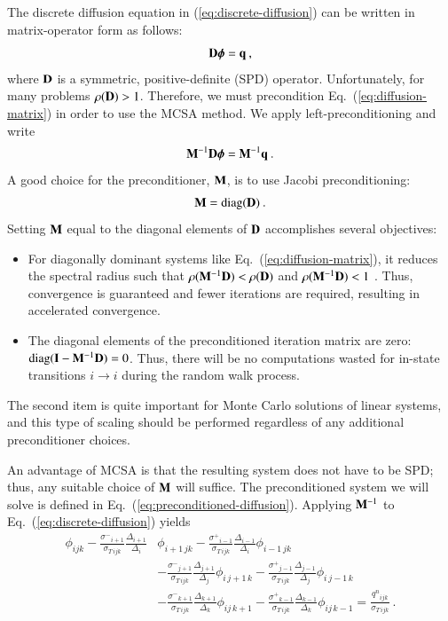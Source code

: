 \documentclass[preprint,12pt]{elsarticle}
\newcommand{\vI}{\ensuremath{\ve{I}}}
\newcommand{\qn}{\ensuremath{q^n}} \newcommand{\Tn}{\ensuremath{T^n}}
\newcommand{\Di}{\ensuremath{\Delta_i}}
\newcommand{\Dj}{\ensuremath{\Delta_j}}
\newcommand{\Dk}{\ensuremath{\Delta_k}}
\newcommand{\sigT}{\ensuremath{\sigma_{T\,ijk}}}
\newcommand{\sigm}{\ensuremath{\sigma^{-}}}
\newcommand{\sigp}{\ensuremath{\sigma^{+}}}
\newcommand{\bphi}{\ensuremath{\boldsymbol{\phi}}}
\DeclareMathOperator{\diag}{diag}
\begin{document}
The discrete diffusion equation in (\ref{eq:discrete-diffusion}) can be
written in matrix-operator form as follows:
\begin{equation}
  \ve{D}\bphi = \ve{q}\:,
  \label{eq:diffusion-matrix}
\end{equation}
where $\mathbf{D}$ is a symmetric, positive-definite (SPD) operator.
Unfortunately, for many problems $\rho(\mathbf{D}) > 1$.  Therefore, we must
precondition Eq.~(\ref{eq:diffusion-matrix}) in order to use the MCSA
method. We apply left-preconditioning and write
\begin{equation}
  \ve{M}^{-1}\ve{D}\bphi = \ve{M}^{-1}\ve{q}\:.
  \label{eq:preconditioned-diffusion}
\end{equation}
A good choice for the preconditioner, $\mathbf{M}$, is to use Jacobi
preconditioning:
\begin{equation}
  \ve{M}=\diag(\ve{D})\:.
  \label{eq:preconditioner}
\end{equation}
Setting $\mathbf{M}$ equal to the diagonal elements of $\mathbf{D}$ accomplishes
several objectives:
\begin{itemize}
\item For diagonally dominant systems like Eq.~(\ref{eq:diffusion-matrix}), it
  reduces the spectral radius such that $\rho(\mathbf{M}^{-1}\mathbf{D}) <
  \rho(\mathbf{D})$ and $\rho(\mathbf{M}^{-1}\mathbf{D}) < 1$ \cite{golub}.  Thus,
  convergence is guaranteed and fewer iterations are required, resulting in
  accelerated convergence.
\item The diagonal elements of the preconditioned iteration matrix are zero:
  $\diag(\vI - \ve{M}^{-1}\ve{D}) = 0$.  Thus, there will be no computations
  wasted for in-state transitions $i\rightarrow i$ during the random walk
  process.
\end{itemize}
The second item is quite important for Monte Carlo solutions of linear
systems, and this type of scaling should be performed regardless of any
additional preconditioner choices. 

An advantage of MCSA is that the resulting system does not have to be SPD;
thus, any suitable choice of $\mathbf{M}$ will suffice.  The preconditioned system
we will solve is defined in Eq.~(\ref{eq:preconditioned-diffusion}).  Applying
$\mathbf{M}^{-1}$ to Eq.~(\ref{eq:discrete-diffusion}) yields
\begin{equation}
  \begin{aligned}
    \phi_{ijk} -
    \frac{\sigm_{i+1}}{\sigT}\frac{\Delta_{i+1}}{\Di}&\phi_{i+1\,jk} -
    \frac{\sigp_{i-1}}{\sigT}\frac{\Delta_{i-1}}{\Di}\phi_{i-1\,jk}\\ &-
    \frac{\sigm_{j+1}}{\sigT}\frac{\Delta_{j+1}}{\Dj}\phi_{i\,j+1\,k}
    -\frac{\sigp_{j-1}}{\sigT}\frac{\Delta_{j-1}}{\Dj}\phi_{i\,j-1\,k}\\ &-
    \frac{\sigm_{k+1}}{\sigT}\frac{\Delta_{k+1}}{\Dk}\phi_{ij\,k+1} -
    \frac{\sigp_{k-1}}{\sigT}\frac{\Delta_{k-1}}{\Dk}\phi_{ij\,k-1} =
    \frac{\qn_{ijk}}{\sigT}\:.
  \end{aligned}
  \label{eq:preconditioned-discrete-diffusion}
\end{equation}
\end{document}
